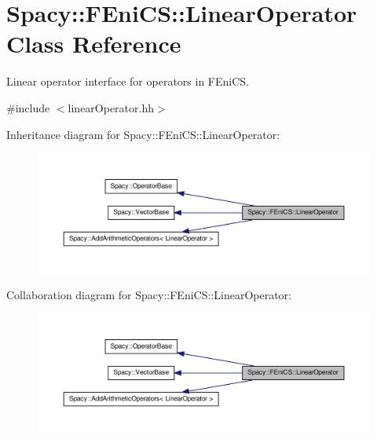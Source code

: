 \hypertarget{classSpacy_1_1FEniCS_1_1LinearOperator}{\section{\-Spacy\-:\-:\-F\-Eni\-C\-S\-:\-:\-Linear\-Operator \-Class \-Reference}
\label{classSpacy_1_1FEniCS_1_1LinearOperator}
}


\-Linear operator interface for operators in \-F\-Eni\-C\-S.  




{\ttfamily \#include $<$linear\-Operator.\-hh$>$}



\-Inheritance diagram for \-Spacy\-:\-:\-F\-Eni\-C\-S\-:\-:\-Linear\-Operator\-:
\nopagebreak
\begin{figure}[H]
\begin{center}
\leavevmode
\includegraphics[width=350pt]{classSpacy_1_1FEniCS_1_1LinearOperator__inherit__graph}
\end{center}
\end{figure}


\-Collaboration diagram for \-Spacy\-:\-:\-F\-Eni\-C\-S\-:\-:\-Linear\-Operator\-:
\nopagebreak
\begin{figure}[H]
\begin{center}
\leavevmode
\includegraphics[width=350pt]{classSpacy_1_1FEniCS_1_1LinearOperator__coll__graph}
\end{center}
\end{figure}
